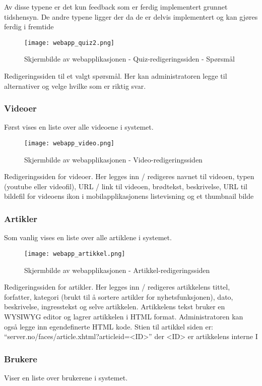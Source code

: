 \documentclass[../main.tex]{subfiles}
\begin{document}
Av disse typene er det kun feedback som er ferdig implementert grunnet tidshensyn. De andre typene ligger der da de er delvis implementert og kan gjøres ferdig i fremtide

\begin{figure}[H]
  \centering
  \texttt{[image: webapp\_quiz2.png]}
  \caption{Skjermbilde av webapplikasjonen - Quiz-redigeringssiden - Spørsmål}
\end{figure}
Redigeringssiden til et valgt spørsmål. Her kan administratoren legge til alternativer og velge hvilke som er riktig svar.


\subsubsection{Videoer}
Først vises en liste over alle videoene i systemet.

\begin{figure}[H]
  \centering
  \texttt{[image: webapp\_video.png]}
  \caption{Skjermbilde av webapplikasjonen - Video-redigeringssiden}
\end{figure}
Redigeringssiden for videoer. Her legges inn / redigeres navnet til videoen, typen (youtube eller videofil), URL / link til videoen, brødtekst, beskrivelse, URL til bildefil for videoens ikon i mobilapplikasjonens listevisning og et thumbnail bilde


\subsubsection{Artikler}
Som vanlig vises en liste over alle artiklene i systemet.

\begin{figure}[H]
  \centering
  \texttt{[image: webapp\_artikkel.png]}
  \caption{Skjermbilde av webapplikasjonen - Artikkel-redigeringssiden}
\end{figure}
Redigeringssiden for artikler. Her legges inn / redigeres artikkelens tittel, forfatter, kategori (brukt til å sortere artikler for nyhetsfunksjonen), dato, beskrivelse, ingresstekst og selve artikkelen. Artikkelens tekst bruker en WYSIWYG editor og lagrer artikkelen i HTML format. Administratoren kan også legge inn egendefinerte HTML kode. Stien til artikkel siden er: “server.no/faces/article.xhtml?articleid=<ID>” der <ID> er artikkelens interne I

\newpage

\subsubsection{Brukere}
Viser en liste over brukerene i systemet.
\end{document}
